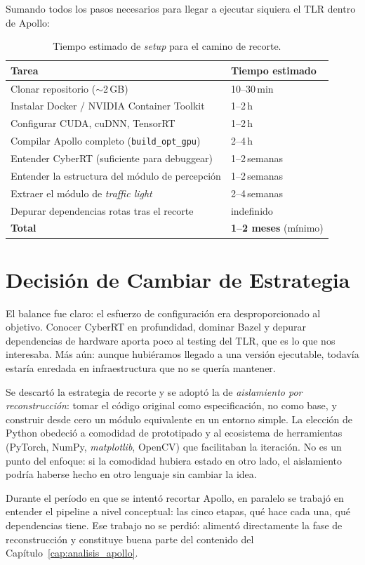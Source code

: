Sumando todos los pasos necesarios para llegar a ejecutar siquiera el TLR dentro de Apollo:

\begin{table}[H]
\centering
\begin{tabular}{|l|l|}
\hline
\textbf{Tarea} & \textbf{Tiempo estimado} \\
\hline
Clonar repositorio ($\sim$2\,GB) & 10--30\,min \\
Instalar Docker / NVIDIA Container Toolkit & 1--2\,h \\
Configurar CUDA, cuDNN, TensorRT & 1--2\,h \\
Compilar Apollo completo (\texttt{build\_opt\_gpu}) & 2--4\,h \\
Entender CyberRT (suficiente para debuggear) & 1--2\,semanas \\
Entender la estructura del módulo de percepción & 1--2\,semanas \\
Extraer el módulo de \textit{traffic light} & 2--4\,semanas \\
Depurar dependencias rotas tras el recorte & indefinido \\
\hline
\textbf{Total} & \textbf{1--2 meses} (mínimo) \\
\hline
\end{tabular}
\caption{Tiempo estimado de \textit{setup} para el camino de recorte.}
\end{table}

\section{Decisión de Cambiar de Estrategia}

El balance fue claro: el esfuerzo de configuración era desproporcionado al objetivo. Conocer CyberRT en profundidad, dominar Bazel y depurar dependencias de hardware aporta poco al testing del TLR, que es lo que nos interesaba. Más aún: aunque hubiéramos llegado a una versión ejecutable, todavía estaría enredada en infraestructura que no se quería mantener.

Se descartó la estrategia de recorte y se adoptó la de \textit{aislamiento por reconstrucción}: tomar el código original como especificación, no como base, y construir desde cero un módulo equivalente en un entorno simple. La elección de Python obedeció a comodidad de prototipado y al ecosistema de herramientas (PyTorch, NumPy, \textit{matplotlib}, OpenCV) que facilitaban la iteración. No es un punto del enfoque: si la comodidad hubiera estado en otro lado, el aislamiento podría haberse hecho en otro lenguaje sin cambiar la idea.

Durante el período en que se intentó recortar Apollo, en paralelo se trabajó en entender el pipeline a nivel conceptual: las cinco etapas, qué hace cada una, qué dependencias tiene. Ese trabajo no se perdió: alimentó directamente la fase de reconstrucción y constituye buena parte del contenido del Capítulo~\ref{cap:analisis_apollo}.